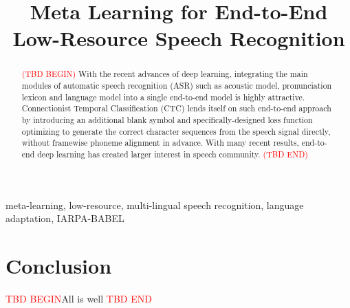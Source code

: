 \documentclass{article}
\title{Meta Learning for End-to-End Low-Resource Speech Recognition}
\begin{document}
%
\maketitle
%
\begin{abstract}
  \textcolor{red}{(TBD BEGIN)} With the recent advances of deep learning, integrating the main modules of automatic speech recognition (ASR) such as acoustic model, pronunciation lexicon and language model into a single end-to-end model is highly attractive. Connectionist Temporal Classification (CTC) lends itself on such end-to-end approach by introducing an additional blank symbol and specifically-designed loss function optimizing to generate the correct character sequences from the speech signal directly, without framewise phoneme alignment in advance. With many recent results, end-to-end deep learning has created larger interest in speech community. \textcolor{red}{(TBD END)}
\end{abstract}
%
\begin{keywords}
  meta-learning, low-resource, multi-lingual speech recognition, language adaptation, IARPA-BABEL
\end{keywords}
%










\section{Conclusion}
\label{sec:conclusion}

\textcolor{red}{TBD BEGIN}All is well \textcolor{red}{TBD END}








\newpage

\end{document}
